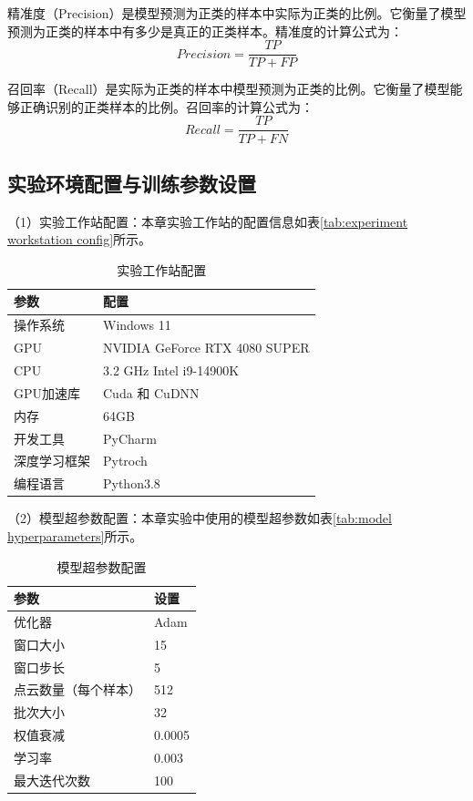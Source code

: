 精准度（Precision）是模型预测为正类的样本中实际为正类的比例。它衡量了模型预测为正类的样本中有多少是真正的正类样本。精准度的计算公式为：
\begin{equation}
    \label{eq:precision}
    Precision = \frac{TP}{TP + FP}
\end{equation}

召回率（Recall）是实际为正类的样本中模型预测为正类的比例。它衡量了模型能够正确识别的正类样本的比例。召回率的计算公式为：
\begin{equation}
    \label{eq:recall}
    Recall = \frac{TP}{TP + FN}
\end{equation} 


\subsection{实验环境配置与训练参数设置}

（1）实验工作站配置：本章实验工作站的配置信息如表\eqref{tab:experiment workstation config}所示。
\begin{table}[htbp]
    \centering
    \caption{实验工作站配置}
    \begin{tabular}{ll}
        \toprule
        \textbf{参数} & \textbf{配置} \\
        \midrule
        操作系统 & Windows 11 \\
        GPU & NVIDIA GeForce RTX 4080 SUPER \\
        CPU & 3.2 GHz Intel i9-14900K \\
        GPU加速库 & Cuda 和 CuDNN \\
        内存 & 64GB \\
        开发工具 & PyCharm \\
        深度学习框架 & Pytroch \\
        编程语言 & Python3.8 \\
        \bottomrule
    \end{tabular}
    \label{tab:experiment workstation config}
\end{table}

（2）模型超参数配置：本章实验中使用的模型超参数如表\eqref{tab:model hyperparameters}所示。
\begin{table}[htbp]
    \centering
    \caption{模型超参数配置}
    \begin{tabular}{ll}
        \toprule
        \textbf{参数} & \textbf{设置} \\
        \midrule
        优化器 & Adam \\
        窗口大小 & 15 \\
        窗口步长 & 5 \\
        点云数量（每个样本） & 512 \\
        批次大小 & 32 \\
        权值衰减 & 0.0005 \\
        学习率 & 0.003 \\
        最大迭代次数 & 100 \\
        \bottomrule
    \end{tabular}
    \label{tab:model hyperparameters}
\end{table}

